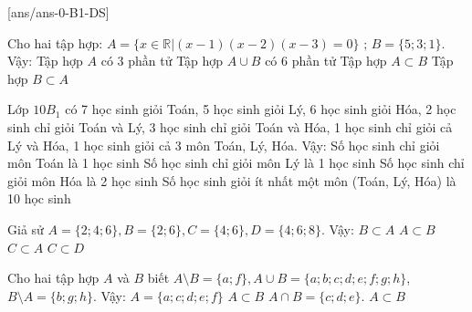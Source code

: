 \cauds
{}[ans/ans-0-B1-DS]
\begin{ex}%
	Cho hai tập hợp: $A=\{\left. x\in \mathbb{R} \right|(x-1)(x-2)(x-3)=0\}\text{ ; }B=\{5;3;1\}$. Vậy:
	\choiceTF
	{\True Tập hợp $A$ có 3 phần tử}
	{Tập hợp $A\cup B$ có 6 phần tử}
	{Tập hợp $A\subset B$}
	{Tập hợp $B\subset A$}	
\end{ex}
\begin{ex}%
	Lớp ${10 B_1}$ có 7 học sinh giỏi Toán, 5 học sinh giỏi Lý, 6 học sinh giỏi Hóa, 2 học sinh chỉ giỏi Toán và Lý, 3 học sinh chỉ giỏi Toán và Hóa, 1 học sinh chỉ giỏi cả Lý và Hóa, 1 học sinh giỏi cả 3 môn Toán, Lý, Hóa. Vậy:
	\choiceTF
	{\True Số học sinh chỉ giỏi môn Toán là 1 học sinh}
	{\True Số học sinh chỉ giỏi môn Lý là 1 học sinh}
	{Số học sinh chỉ giỏi môn Hóa là 2 học sinh}
	{\True Số học sinh giỏi ít nhất một môn (Toán, Lý, Hóa) là 10 học sinh}
\end{ex}
\begin{ex}%
	Giả sử ${A=\{2 ; 4 ; 6\}, B=\{2 ; 6\}, C=\{4 ; 6\}, D=\{4 ; 6 ; 8\}}$. Vậy:
	\choiceTF
	{\True $B\subset A$}
	{$A\subset B$}
	{\True $C\subset A$}
	{\True $C\subset D$}
\end{ex}
\begin{ex}%
	Cho hai tập hợp ${A}$ và ${B}$ biết ${A \setminus B=\{a ; f\}, A \cup B=\{a ; b ; c ; d ; e ; f ; g ; h\}}$,\\
	${B \setminus A=\{b ; g ; h\}}$. Vậy:
	\choiceTF
	{\True ${A=\{a ; c ; d ; e ; f\}}$}
	{\True $A\subset B$}
	{\True $A\cap B=\{c;d;e\}.$}
	{$A\subset B$}	
\end{ex}

